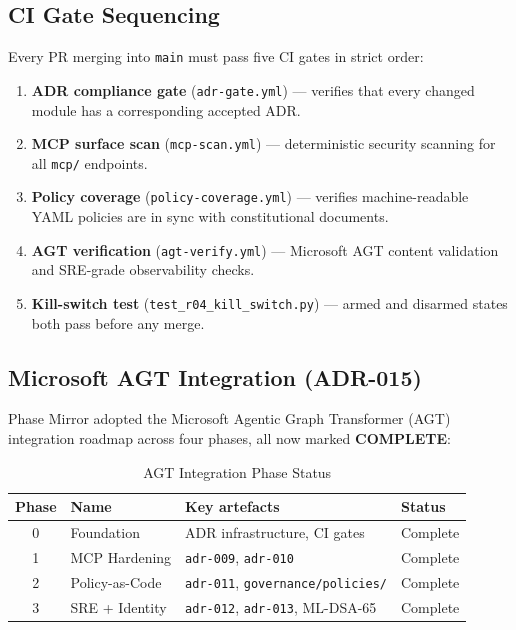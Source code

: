 \documentclass[12pt,a4paper]{article}
\theoremstyle{definition}
\theoremstyle{plain}
\theoremstyle{remark}
\begin{document}
\subsection{CI Gate Sequencing}

Every PR merging into \texttt{main} must pass five CI gates in strict order:

\begin{enumerate}
  \item \textbf{ADR compliance gate} (\texttt{adr-gate.yml}) --- verifies that
    every changed module has a corresponding accepted ADR.
  \item \textbf{MCP surface scan} (\texttt{mcp-scan.yml}) --- deterministic
    security scanning for all \texttt{mcp/} endpoints.
  \item \textbf{Policy coverage} (\texttt{policy-coverage.yml}) --- verifies
    machine-readable YAML policies are in sync with constitutional documents.
  \item \textbf{AGT verification} (\texttt{agt-verify.yml}) --- Microsoft AGT
    content validation and SRE-grade observability checks.
  \item \textbf{Kill-switch test} (\texttt{test\_r04\_kill\_switch.py}) ---
    armed and disarmed states both pass before any merge.
\end{enumerate}

\subsection{Microsoft AGT Integration (ADR-015)}

Phase Mirror adopted the Microsoft Agentic Graph Transformer (AGT) integration
roadmap across four phases, all now marked \textbf{COMPLETE}:

\begin{table}[h!]
\centering
\caption{AGT Integration Phase Status}
\begin{tabular}{clll}
\toprule
\textbf{Phase} & \textbf{Name} & \textbf{Key artefacts} & \textbf{Status} \\
\midrule
0 & Foundation     & ADR infrastructure, CI gates         & Complete \\
1 & MCP Hardening  & \texttt{adr-009}, \texttt{adr-010}   & Complete \\
2 & Policy-as-Code & \texttt{adr-011}, \texttt{governance/policies/} & Complete \\
3 & SRE + Identity & \texttt{adr-012}, \texttt{adr-013}, ML-DSA-65  & Complete \\
\bottomrule
\end{tabular}
\end{table}
\end{document}
